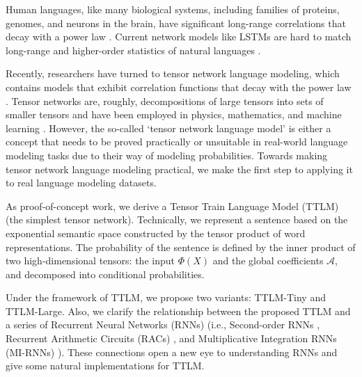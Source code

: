 \documentclass{article}
\theoremstyle{plain}
\theoremstyle{definition}
\theoremstyle{remark}
\begin{document}

Human languages, like many biological systems, including families of proteins, genomes, and neurons in the brain, have significant long-range correlations that decay with a power law \citep{tagliazucchi2012criticality, mora2011biological}.  
Current network models like LSTMs \cite{hochreiter1997long} are hard to match long-range and higher-order statistics of natural languages \citep{lin2016critical}. 


Recently, researchers have turned to tensor network language modeling,  which contains models that exhibit correlation functions that decay with the power law \citep{pestun2017tensor,pestun2017language,miller2021tensor}. Tensor networks are, roughly, decompositions of large tensors into sets of smaller tensors and have been employed in physics, mathematics, and machine learning \citep{cohen2016expressive}. However, the so-called `tensor network language model' is either a concept that needs to be proved practically \cite{pestun2017tensor} or unsuitable in real-world language modeling tasks \citep{miller2021tensor} due to their way of modeling probabilities.  Towards making tensor network language modeling practical, we make the first step to applying it to real language modeling datasets.

As proof-of-concept work, we derive a Tensor Train Language Model (TTLM) (the simplest tensor network).  Technically, we represent a sentence based on the exponential semantic space constructed by the tensor product of word representations. The probability of the sentence is defined by the inner product of two high-dimensional tensors: the input $\Phi(X)$ and the global 
coefficients $\mathcal{A}$, and decomposed into conditional probabilities.  

Under the framework of TTLM,  we propose two variants:  TTLM-Tiny and TTLM-Large. Also, we clarify the relationship between the proposed TTLM and a series of Recurrent Neural Networks (RNNs) (i.e., Second-order RNNs \citep{goudreau1994first},  Recurrent Arithmetic Circuits (RACs) \citep{levine2018benefits}, and Multiplicative Integration RNNs (MI-RNNs) \citep{wu_multiplicative_2016}). These connections open a new eye to understanding RNNs and give some natural implementations for TTLM.
\end{document}
